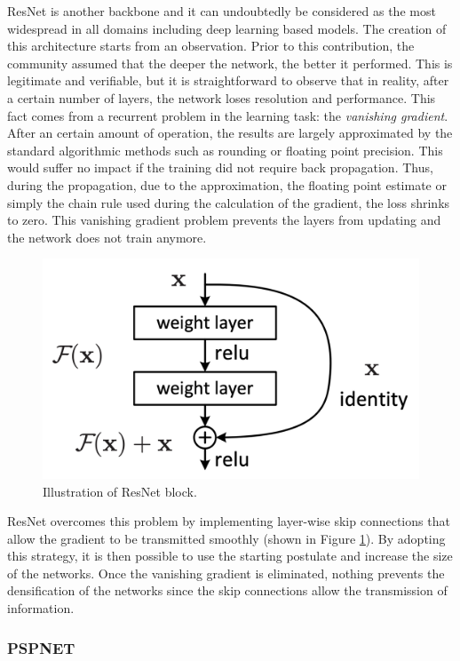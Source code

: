 ResNet \cite{he2016deep} is another backbone and it can undoubtedly be considered as the most widespread in all domains including deep learning based models. The creation of this architecture starts from an observation. Prior to this contribution, the community assumed that the deeper the network, the better it performed. This is legitimate and verifiable, but it is straightforward to observe that in reality, after a certain number of layers, the network loses resolution and performance. This fact comes from a recurrent problem in the learning task: the \emph{vanishing gradient}. After an certain amount of operation, the results are largely approximated by the standard algorithmic methods such as rounding or floating point precision. This would suffer no impact if the training did not require back propagation. Thus, during the propagation, due to the approximation, the floating point estimate \cite{gysel2016hardware} or simply the chain rule \cite{leibniz} used during the calculation of the gradient, the loss shrinks to zero. This vanishing gradient problem prevents the layers from updating and the network does not train anymore.

\begin{figure}[h]
	\centering
	\includegraphics[width=0.6\linewidth]{Figures/SOA/resnetblock}
	\caption[Illustration of ResNet block.]{Illustration of ResNet \cite{he2016deep} block.}
	\label{fig:resnetblock}
\end{figure}


ResNet overcomes this problem by implementing layer-wise skip connections that allow the gradient to be transmitted smoothly (shown in Figure \ref{fig:resnetblock}). By adopting this strategy, it is then possible to use the starting postulate and increase the size of the networks. Once the vanishing gradient is eliminated, nothing prevents the densification of the networks since the skip connections allow the transmission of information.

\subsubsection{PSPNET}

